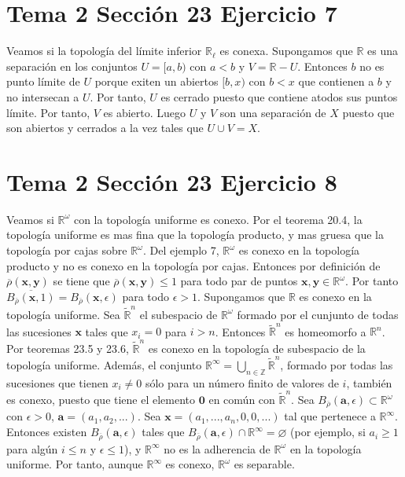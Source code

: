 \documentclass{article}
\newcommand{\vect}[1]{\boldsymbol{#1}}
\begin{document}
\section{Tema 2 Sección 23 Ejercicio 7}
Veamos si la topología del límite inferior $\mathbb{R}_\ell$ es conexa. Supongamos que $\mathbb{R}$ es una separación en los conjuntos $U=[a,b)$ con $a<b$ y $V=\mathbb{R}-U$. Entonces $b$ no es punto límite de $U$ porque exiten un abiertos $[b,x)$  con $b<x$ que contienen a $b$ y no intersecan a $U$. Por tanto, $U$ es cerrado puesto que contiene atodos sus puntos límite. Por tanto, $V$ es abierto. Luego $U$ y $V$ son una separación de $X$ puesto que son abiertos y cerrados a la vez tales que $U\cup V=X$. 
\section{Tema 2 Sección 23 Ejercicio 8}
Veamos si $\mathbb{R}^{\omega}$ con la topología uniforme es conexo. Por el teorema 20.4, la topología uniforme es mas fina que la topología producto, y mas gruesa que la topología por cajas sobre $\mathbb{R}^{\omega}$. Del ejemplo 7, $\mathbb{R}^{\omega}$ es conexo en la topología producto y no es conexo en la topología por cajas. Entonces por definición de $\overline{\rho}(\vect{x},\vect{y})$ se tiene que $\overline{\rho}(\vect{x},\vect{y})\leq 1$ para todo par de puntos $\vect{x},\vect{y}\in \mathbb{R}^{\omega}$. Por tanto $\overline{B_{\overline{\rho}}(\vect{x},1)}=B_{\overline{\rho}}(\vect{x},\epsilon)$ para todo $\epsilon> 1$. Supongamos que $\mathbb{R}$ es conexo en la topología uniforme. Sea $\widetilde{\mathbb{R}}^n$ el subespacio de $\mathbb{R}^{\omega}$ formado por el cunjunto de todas las sucesiones $\vect{x}$ tales que $x_i=0$ para $i>n$. Entonces $\widetilde{\mathbb{R}}^n$ es homeomorfo a $\mathbb{R}^n$. Por teoremas 23.5 y 23.6, $\widetilde{\mathbb{R}}^n$ es conexo en la topología de subespacio de la topología  uniforme. Además, el conjunto $\mathbb{R}^{\infty}=\bigcup_{n\in \mathbb{Z}} \widetilde{\mathbb{R}}^n$, formado por todas las sucesiones que tienen $x_i\neq 0$ sólo para un número finito de valores de $i$, también es conexo, puesto que tiene el elemento $\vect{0}$ en común con $\widetilde{\mathbb{R}}^n$. Sea $B_{\overline{\rho}}(\vect{a},\epsilon)\subset\mathbb{R}^{\omega}$ con $\epsilon>0$, $\vect{a}=(a_1,a_2,...)$. Sea $\vect{x}=(a_1,...,a_n,0,0,...)$ tal que pertenece a $\mathbb{R}^{\infty}$. Entonces existen $B_{\overline{\rho}}(\vect{a},\epsilon)$ tales que  $B_{\overline{\rho}}(\vect{a},\epsilon)\cap\mathbb{R}^\infty= \varnothing$ (por ejemplo, si $a_i\geq 1$ para algún $i\leq n$ y $\epsilon \leq 1$), y $\mathbb{R}^\infty$ no es la adherencia de $\mathbb{R}^\omega$ en la topología uniforme. Por tanto, aunque $\mathbb{R}^\infty$ es conexo, $\mathbb{R}^\omega$ es separable.
\end{document}
